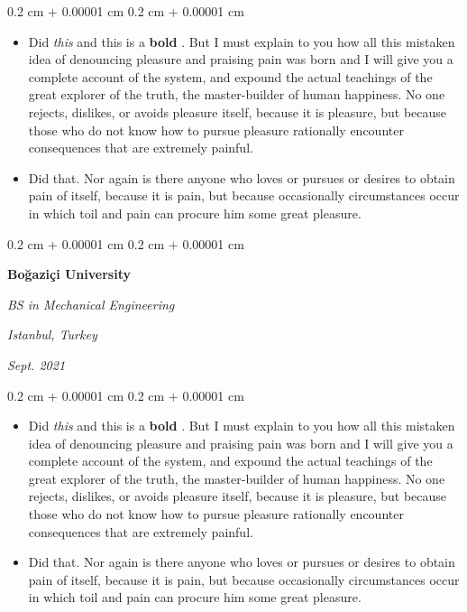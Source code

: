 \documentclass[10pt, letterpaper]{article}
\newenvironment{highlights}{
    \begin{itemize}[
        topsep=0.10 cm,
        parsep=0.10 cm,
        partopsep=0pt,
        itemsep=0pt,
        leftmargin=0.4 cm + 10pt
    ]
}{
    \end{itemize}
} %
\newenvironment{onecolentry}{
    \begin{adjustwidth}{
        0.2 cm + 0.00001 cm
    }{
        0.2 cm + 0.00001 cm
    }
}{
    \end{adjustwidth}
} %
\newenvironment{twocolentry}[2][]{
    \onecolentry
    \def\secondColumn{#2}
    \setcolumnwidth{\fill, 4.5 cm}
    \begin{paracol}{2}
}{
    \switchcolumn \raggedleft \secondColumn
    \end{paracol}
    \endonecolentry
} %
\let\hrefWithoutArrow\href
\renewcommand{\href}[2]{\hrefWithoutArrow{#1}{\mbox{\ifthenelse{\equal{#2}{}}{ }{#2 }\raisebox{.15ex}{\footnotesize \faExternalLink*}}}}
\begin{document}
        \vspace{0.10 cm-3px}
        \begin{onecolentry}
            \begin{highlights}
                \item Did \textit{this} and this is a \textbf{bold} \href{https://example.com}{link}. But I must explain to you how all this mistaken idea of denouncing pleasure and praising pain was born and I will give you a complete account of the system, and expound the actual teachings of the great explorer of the truth, the master-builder of human happiness. No one rejects, dislikes, or avoids pleasure itself, because it is pleasure, but because those who do not know how to pursue pleasure rationally encounter consequences that are extremely painful.
                \item Did that. Nor again is there anyone who loves or pursues or desires to obtain pain of itself, because it is pain, but because occasionally circumstances occur in which toil and pain can procure him some great pleasure.
            \end{highlights}
        \end{onecolentry}


        \vspace{0.2 cm-3px}

        \begin{twocolentry}{
        \textit{Istanbul, Turkey}    
            
        \textit{Sept. 2021}}
            \textbf{Boğaziçi University}

            \textit{BS in Mechanical Engineering}
        \end{twocolentry}

        \vspace{0.10 cm-3px}
        \begin{onecolentry}
            \begin{highlights}
                \item Did \textit{this} and this is a \textbf{bold} \href{https://example.com}{link}. But I must explain to you how all this mistaken idea of denouncing pleasure and praising pain was born and I will give you a complete account of the system, and expound the actual teachings of the great explorer of the truth, the master-builder of human happiness. No one rejects, dislikes, or avoids pleasure itself, because it is pleasure, but because those who do not know how to pursue pleasure rationally encounter consequences that are extremely painful.
                \item Did that. Nor again is there anyone who loves or pursues or desires to obtain pain of itself, because it is pain, but because occasionally circumstances occur in which toil and pain can procure him some great pleasure.
            \end{highlights}
        \end{onecolentry}
\end{document}
